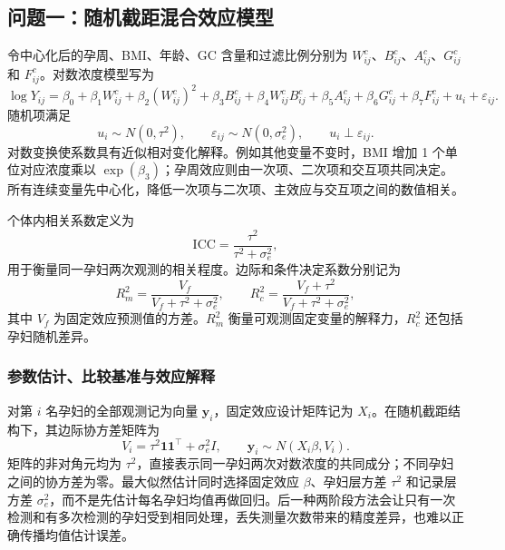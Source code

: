\documentclass[UTF8,a4paper,12pt]{ctexart}
\begin{document}
\subsection{问题一：随机截距混合效应模型}

令中心化后的孕周、BMI、年龄、GC 含量和过滤比例分别为 $W^c_{ij}$、$B^c_{ij}$、$A^c_{ij}$、$G^c_{ij}$ 和 $F^c_{ij}$。对数浓度模型写为
\begin{equation}
\log Y_{ij}=\beta_0+\beta_1W^c_{ij}+\beta_2(W^c_{ij})^2+\beta_3B^c_{ij}+\beta_4W^c_{ij}B^c_{ij}+\beta_5A^c_{ij}+\beta_6G^c_{ij}+\beta_7F^c_{ij}+u_i+\varepsilon_{ij}.
\label{eq:mixed}
\end{equation}
随机项满足
\begin{equation}
u_i\sim N(0,\tau^2),\qquad \varepsilon_{ij}\sim N(0,\sigma_e^2),\qquad u_i\perp\varepsilon_{ij}.
\label{eq:random}
\end{equation}
对数变换使系数具有近似相对变化解释。例如其他变量不变时，BMI 增加 1 个单位对应浓度乘以 $\exp(\beta_3)$；孕周效应则由一次项、二次项和交互项共同决定。所有连续变量先中心化，降低一次项与二次项、主效应与交互项之间的数值相关。

个体内相关系数定义为
\begin{equation}
\mathrm{ICC}=\frac{\tau^2}{\tau^2+\sigma_e^2},
\label{eq:icc}
\end{equation}
用于衡量同一孕妇两次观测的相关程度。边际和条件决定系数分别记为
\begin{equation}
R_m^2=\frac{V_f}{V_f+\tau^2+\sigma_e^2},\qquad
R_c^2=\frac{V_f+\tau^2}{V_f+\tau^2+\sigma_e^2},
\label{eq:r2}
\end{equation}
其中 $V_f$ 为固定效应预测值的方差。$R_m^2$ 衡量可观测固定变量的解释力，$R_c^2$ 还包括孕妇随机差异。

\subsubsection{参数估计、比较基准与效应解释}

对第 $i$ 名孕妇的全部观测记为向量 $\boldsymbol y_i$，固定效应设计矩阵记为 $X_i$。在随机截距结构下，其边际协方差矩阵为
\begin{equation}
V_i=\tau^2\boldsymbol 1\boldsymbol 1^\top+\sigma_e^2 I,
\qquad
\boldsymbol y_i\sim N(X_i\beta,V_i).
\label{eq:mixedcov}
\end{equation}
矩阵的非对角元均为 $\tau^2$，直接表示同一孕妇两次对数浓度的共同成分；不同孕妇之间的协方差为零。最大似然估计同时选择固定效应 $\beta$、孕妇层方差 $\tau^2$ 和记录层方差 $\sigma_e^2$，而不是先估计每名孕妇均值再做回归。后一种两阶段方法会让只有一次检测和有多次检测的孕妇受到相同处理，丢失测量次数带来的精度差异，也难以正确传播均值估计误差。
\end{document}
